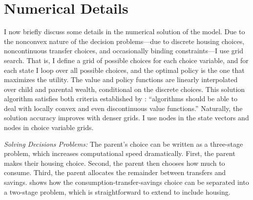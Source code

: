 \documentclass[12pt]{article}
\begin{document}
\begin{table}
	\center 
\end{table}

\section{Numerical Details}\label{sec:computational}
I now briefly discuss some details in the numerical solution of the model. Due to the nonconvex nature of the decision problems---due to discrete housing choices, noncontinuous transfer choices, and occasionally binding constraints---I use grid search. That is, I define a grid of possible choices for each choice variable, and for each state I loop over all possible choices, and the optimal policy is the one that maximizes the utility. The value and policy functions are linearly interpolated over child and parental wealth, conditional on the discrete choices. This solution algorithm satisfies both criteria established by \cite[p.30]{Barczyk2020}: ``algorithms should be able to deal with locally convex and even discontinuous value functions.'' Naturally, the solution accuracy improves with denser grids. I use {\parnstate} nodes in the state vectors and {\parnchoice} nodes in choice variable grids.

\textit{Solving Decisions Problems:} 
The parent's choice can be written as a three-stage problem, which increases computational speed dramatically. First, the parent makes their housing choice. Second, the parent then chooses how much to consume. Third, the parent allocates the remainder between transfers and savings. \cite{Chu2020} shows how the consumption-transfer-savings choice can be separated into a two-stage problem, which is straightforward to extend to include housing.
\end{document}
